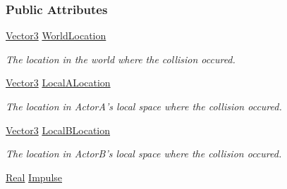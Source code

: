 \subsubsection*{Public Attributes}
\begin{DoxyCompactItemize}
\item 
\hypertarget{classphys_1_1EventCollision_a8f8a80d921bfe1ec24171c5be3ed7641}{
\hyperlink{classphys_1_1Vector3}{Vector3} \hyperlink{classphys_1_1EventCollision_a8f8a80d921bfe1ec24171c5be3ed7641}{WorldLocation}}
\label{classphys_1_1EventCollision_a8f8a80d921bfe1ec24171c5be3ed7641}

\begin{DoxyCompactList}\small\item\em The location in the world where the collision occured. \item\end{DoxyCompactList}\item 
\hypertarget{classphys_1_1EventCollision_a2fa146b8453d2f504abcd5055d2c2a90}{
\hyperlink{classphys_1_1Vector3}{Vector3} \hyperlink{classphys_1_1EventCollision_a2fa146b8453d2f504abcd5055d2c2a90}{LocalALocation}}
\label{classphys_1_1EventCollision_a2fa146b8453d2f504abcd5055d2c2a90}

\begin{DoxyCompactList}\small\item\em The location in ActorA's local space where the collision occured. \item\end{DoxyCompactList}\item 
\hypertarget{classphys_1_1EventCollision_a50d6df6b25532530cd296353ac0b55c6}{
\hyperlink{classphys_1_1Vector3}{Vector3} \hyperlink{classphys_1_1EventCollision_a50d6df6b25532530cd296353ac0b55c6}{LocalBLocation}}
\label{classphys_1_1EventCollision_a50d6df6b25532530cd296353ac0b55c6}

\begin{DoxyCompactList}\small\item\em The location in ActorB's local space where the collision occured. \item\end{DoxyCompactList}\item 
\hypertarget{classphys_1_1EventCollision_a577552db818f54a4092baccf597823a2}{
\hyperlink{namespacephys_af7eb897198d265b8e868f45240230d5f}{Real} \hyperlink{classphys_1_1EventCollision_a577552db818f54a4092baccf597823a2}{Impulse}}
\label{classphys_1_1EventCollision_a577552db818f54a4092baccf597823a2}


\end{DoxyCompactItemize}
